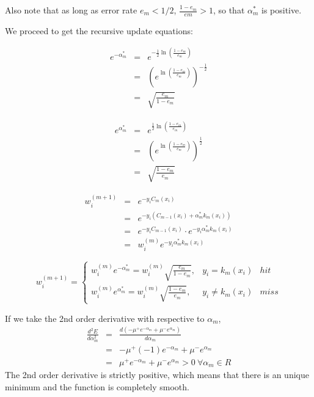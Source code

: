 \documentclass[]{article}  %
\begin{document}
Also note that as long as error rate $e_m < 1/2$, $\frac{1-e_m}{em} > 1$, so that $\alpha_m^*$ is positive. 

We proceed to get the recursive update equations:

\begin{eqnarray*}
e^{-\alpha_m^*} &=& e^{-\frac{1}{2} \ln \left(\frac{1-e_m}{e_m}\right)}\\
&=& (e^{\ln \left(\frac{1-e_m}{e_m}\right)})^{-\frac{1}{2}}\\
&=& \sqrt{\frac{e_m}{1-e_m}}
\end{eqnarray*}

\begin{eqnarray*}
e^{\alpha_m^*} &=& e^{\frac{1}{2} \ln \left(\frac{1-e_m}{e_m}\right)}\\
&=& (e^{\ln \left(\frac{1-e_m}{e_m}\right)})^{\frac{1}{2}}\\
&=& \sqrt{\frac{1-e_m}{e_m}}
\end{eqnarray*}

\begin{eqnarray*}
w_i^{(m+1)} &=& e^{-y_i C_m(x_i)}\\
&=& e^{-y_i (C_{m-1}(x_i) + \alpha_m^* k_m(x_i))}\\
&=& e^{-y_i C_{m-1}(x_i)} \cdot e^{-y_i \alpha_m^* k_m(x_i)}\\
&=& w_i^{(m)} e^{-y_i \alpha_m^* k_m(x_i)}
\end{eqnarray*}

\begin{equation}\label{weight-update}
w_i^{(m+1)}=\left\{
\begin{array}{ccc}
w_i^{(m)} e^ {-\alpha_m^*}=w_i^{(m)}\sqrt{\frac{e_m}{1-e_m}} ,  & y_i = k_m(x_i) & hit\\
w_i^{(m)} e^{\alpha_m^*}=w_i^{(m)}\sqrt{\frac{1-e_m}{e_m}}, & y_i \neq k_m(x_i) & miss
\end{array} \right.
\end{equation}

If we take the 2nd order derivative with respective to $\alpha_m$, 
\begin{eqnarray*}
\frac {d^2E}{d\alpha_m^2} &=& \frac{d(-\mu^+e^{-\alpha_m} + \mu^- e^{\alpha_m})}{d\alpha_m}\\
&=& -\mu^+(-1)e^{-\alpha_m} + \mu^- e^{\alpha_m} \\
&=& \mu^+e^{-\alpha_m} + \mu^- e^{\alpha_m} > 0 \ \forall \alpha_m \in R
\end{eqnarray*}
The 2nd order derivative is strictly positive, which means that there is an unique minimum and the function is completely smooth.
\end{document}
